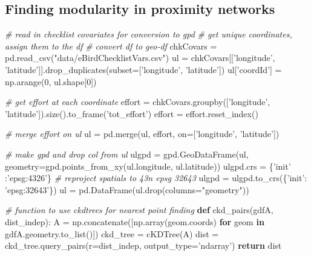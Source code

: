 \documentclass[]{article}
\newenvironment{Shaded}{}{}
\newcommand{\CommentTok}[1]{\textcolor[rgb]{0.38,0.63,0.69}{\textit{#1}}}
\newcommand{\ControlFlowTok}[1]{\textcolor[rgb]{0.00,0.44,0.13}{\textbf{#1}}}
\newcommand{\DecValTok}[1]{\textcolor[rgb]{0.25,0.63,0.44}{#1}}
\newcommand{\KeywordTok}[1]{\textcolor[rgb]{0.00,0.44,0.13}{\textbf{#1}}}
\newcommand{\NormalTok}[1]{#1}
\newcommand{\OperatorTok}[1]{\textcolor[rgb]{0.40,0.40,0.40}{#1}}
\newcommand{\StringTok}[1]{\textcolor[rgb]{0.25,0.44,0.63}{#1}}
\begin{document}
\hypertarget{finding-modularity-in-proximity-networks}{%
\subsection{Finding modularity in proximity networks}\label{finding-modularity-in-proximity-networks}}

\begin{Shaded}
\begin{Highlighting}[]
\CommentTok{# read in checklist covariates for conversion to gpd}
\CommentTok{# get unique coordinates, assign them to the df}
\CommentTok{# convert df to geo-df}
\NormalTok{chkCovars }\OperatorTok{=}\NormalTok{ pd.read_csv(}\StringTok{"data/eBirdChecklistVars.csv"}\NormalTok{)}
\NormalTok{ul }\OperatorTok{=}\NormalTok{ chkCovars[[}\StringTok{'longitude'}\NormalTok{, }\StringTok{'latitude'}\NormalTok{]].drop_duplicates(subset}\OperatorTok{=}\NormalTok{[}\StringTok{'longitude'}\NormalTok{, }\StringTok{'latitude'}\NormalTok{])}
\NormalTok{ul[}\StringTok{'coordId'}\NormalTok{] }\OperatorTok{=}\NormalTok{ np.arange(}\DecValTok{0}\NormalTok{, ul.shape[}\DecValTok{0}\NormalTok{])}

\CommentTok{# get effort at each coordinate}
\NormalTok{effort }\OperatorTok{=}\NormalTok{ chkCovars.groupby([}\StringTok{'longitude'}\NormalTok{, }\StringTok{'latitude'}\NormalTok{]).size().to_frame(}\StringTok{'tot_effort'}\NormalTok{)}
\NormalTok{effort }\OperatorTok{=}\NormalTok{ effort.reset_index()}

\CommentTok{# merge effort on ul}
\NormalTok{ul }\OperatorTok{=}\NormalTok{ pd.merge(ul, effort, on}\OperatorTok{=}\NormalTok{[}\StringTok{'longitude'}\NormalTok{, }\StringTok{'latitude'}\NormalTok{])}

\CommentTok{# make gpd and drop col from ul}
\NormalTok{ulgpd }\OperatorTok{=}\NormalTok{ gpd.GeoDataFrame(ul, geometry}\OperatorTok{=}\NormalTok{gpd.points_from_xy(ul.longitude, ul.latitude))}
\NormalTok{ulgpd.crs }\OperatorTok{=}\NormalTok{ \{}\StringTok{'init'}\NormalTok{ :}\StringTok{'epsg:4326'}\NormalTok{\}}
\CommentTok{# reproject spatials to 43n epsg 32643}
\NormalTok{ulgpd }\OperatorTok{=}\NormalTok{ ulgpd.to_crs(\{}\StringTok{'init'}\NormalTok{: }\StringTok{'epsg:32643'}\NormalTok{\})}
\NormalTok{ul }\OperatorTok{=}\NormalTok{ pd.DataFrame(ul.drop(columns}\OperatorTok{=}\StringTok{"geometry"}\NormalTok{))}

\CommentTok{# function to use ckdtrees for nearest point finding}
\KeywordTok{def}\NormalTok{ ckd_pairs(gdfA, dist_indep):}
\NormalTok{    A }\OperatorTok{=}\NormalTok{ np.concatenate([np.array(geom.coords) }\ControlFlowTok{for}\NormalTok{ geom }\KeywordTok{in}\NormalTok{ gdfA.geometry.to_list()])}
\NormalTok{    ckd_tree }\OperatorTok{=}\NormalTok{ cKDTree(A)}
\NormalTok{    dist }\OperatorTok{=}\NormalTok{ ckd_tree.query_pairs(r}\OperatorTok{=}\NormalTok{dist_indep, output_type}\OperatorTok{=}\StringTok{'ndarray'}\NormalTok{)}
    \ControlFlowTok{return}\NormalTok{ dist}


\end{Highlighting}
\end{Shaded}
\end{document}
